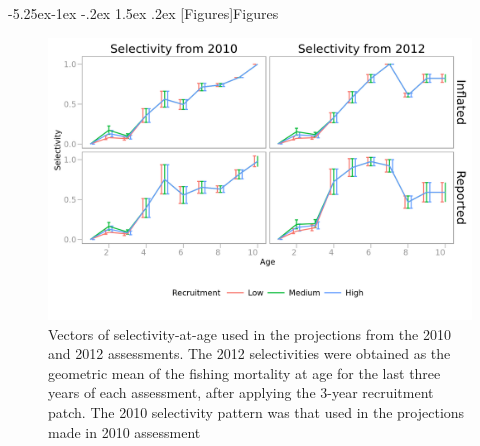\documentclass[a4paper, 10pt]{article}
\makeatletter
\renewcommand{\section}{\@startsection{section}{1}{\z@}%
  {-5.25ex\@plus -1ex \@minus -.2ex}%
  {1.5ex \@plus .2ex}%
  {\normalfont\bfseries}}
\makeatother
\begin{document}
 


\newpage
\section[Figures]{Figures}

\begin{figure}[!ht]\begin{center}\includegraphics[width=6in]{7_1_1.png}\end{center}
\caption{Vectors of selectivity-at-age used in the projections from the 2010 and 2012 assessments. 
The 2012 selectivities were obtained as the geometric mean of the fishing mortality at age for the last three years of each assessment, 
after applying the 3-year recruitment patch. The 2010 selectivity pattern was that used in the projections made in 2010 assessment}
\label{fig:1}\end{figure}
\end{document}
